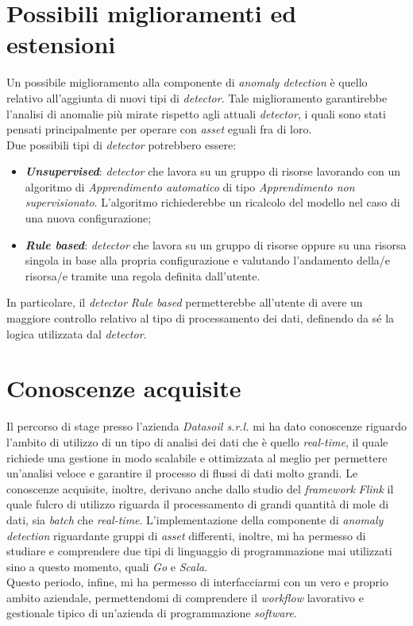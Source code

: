 \section{Possibili miglioramenti ed estensioni}
Un possibile miglioramento alla componente di \textit{anomaly detection} è quello relativo all'aggiunta di nuovi tipi di \textit{detector}. Tale miglioramento garantirebbe l'analisi di anomalie più mirate rispetto agli attuali \textit{detector}, i quali sono stati pensati principalmente per operare con \textit{asset} eguali fra di loro.\\
Due possibili tipi di \textit{detector} potrebbero essere:
\begin{itemize}
	\item{\textbf{\textit{Unsupervised}}: \textit{detector} che lavora su un gruppo di risorse lavorando con un algoritmo di \textit{\gls{Apprendimento automatico}} di tipo \textit{\gls{Apprendimento non supervisionato}}. L'algoritmo richiederebbe un ricalcolo del modello nel caso di una nuova configurazione;}
	\item{\textbf{\textit{Rule based}}: \textit{detector} che lavora su un gruppo di risorse oppure su una risorsa singola in base alla propria configurazione e valutando l'andamento della/e risorsa/e tramite una regola definita dall'utente.}
\end{itemize}
In particolare, il \textit{detector} \textit{Rule based} permetterebbe all'utente di avere un maggiore controllo relativo al tipo di processamento dei dati, definendo da sé la logica utilizzata dal \textit{detector}.



\section{Conoscenze acquisite}
Il percorso di stage presso l'azienda \textit{Datasoil s.r.l.} mi ha dato conoscenze riguardo l'ambito di utilizzo di un tipo di analisi dei dati che è quello \textit{real-time}, il quale richiede una gestione in modo scalabile e ottimizzata al meglio per permettere un'analisi veloce e garantire il processo di flussi di dati molto grandi. Le conoscenze acquisite, inoltre, derivano anche dallo studio del \textit{\textit{\gls{framework}}} \textit{Flink} il quale fulcro di utilizzo riguarda il processamento di grandi quantità di mole di dati, sia \textit{batch} che \textit{real-time}. L'implementazione della componente di \textit{anomaly detection} riguardante gruppi di \textit{asset} differenti, inoltre, mi ha permesso di studiare e comprendere due tipi di linguaggio di programmazione mai utilizzati sino a questo momento, quali \textit{Go} e \textit{Scala}.\\
Questo periodo, infine, mi ha permesso di interfacciarmi con un vero e proprio ambito aziendale, permettendomi di comprendere il \textit{workflow} lavorativo e gestionale tipico di un'azienda di programmazione \textit{software}.

